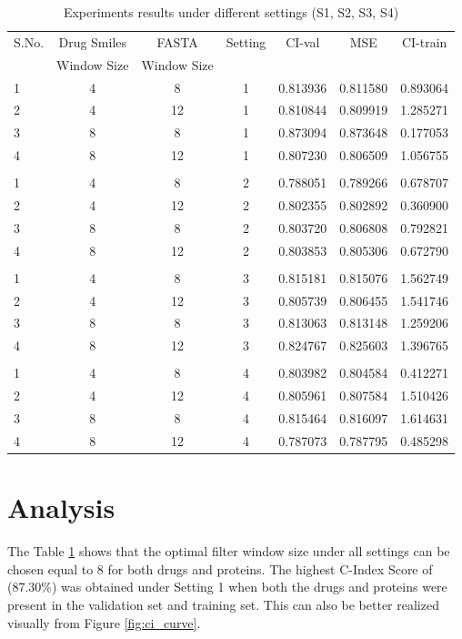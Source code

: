 \begin{table}[H]
    \centering
    \caption{Experiments results under different settings (S1, S2, S3, S4)}
    \begin{tabular}{|l|c|c|c|c|c|c|}
    \hline 
    
     S.No. & Drug Smiles & FASTA & Setting & CI-val & MSE & CI-train \\ 
     & Window Size &  Window Size  &  & &  &  \\  \hline 
    1 & 4 & 8 & 1 & 0.813936 & 0.811580 & 0.893064 \\ \hline
    2 & 4 & 12 & 1 & 0.810844 & 0.809919 & 1.285271 \\ \hline
    3 & 8 & 8 & 1 & 0.873094 & 0.873648 & 0.177053 \\ \hline
    4 & 8 & 12 & 1 & 0.807230 & 0.806509 & 1.056755 \\ \hline
    \\ \hline
    1 & 4 & 8 & 2 & 0.788051 & 0.789266 & 0.678707 \\ \hline
    2 & 4 & 12 & 2 & 0.802355 & 0.802892 & 0.360900 \\ \hline
    3 & 8 & 8 & 2 & 0.803720 & 0.806808 & 0.792821 \\ \hline
    4 & 8 & 12 & 2 & 0.803853 & 0.805306 & 0.672790 \\ \hline
    \\ \hline
    1 & 4 & 8 & 3 & 0.815181 & 0.815076 & 1.562749 \\ \hline
    2 & 4 & 12 & 3 & 0.805739 & 0.806455 & 1.541746 \\ \hline
    3 & 8 & 8 & 3 & 0.813063 & 0.813148 & 1.259206 \\ \hline
    4 & 8 & 12 & 3 & 0.824767 & 0.825603 & 1.396765 \\ \hline
    \\ \hline
    1 & 4 & 8 & 4 & 0.803982 & 0.804584 & 0.412271 \\ \hline
    2 & 4 & 12 & 4 & 0.805961 & 0.807584 & 1.510426 \\ \hline
    3 & 8 & 8 & 4 & 0.815464 & 0.816097 & 1.614631 \\ \hline
    4 & 8 & 12 & 4 & 0.787073 & 0.787795 & 0.485298 \\ \hline
    
    
    \end{tabular}
    \label{table:results}
\end{table}

\section{Analysis}
The Table \ref{table:results} shows that the optimal filter window size under all settings can be chosen equal to 8 for both drugs and proteins. The highest C-Index Score of (87.30\%) was obtained under Setting 1 when both the drugs and proteins were present in the validation set and training set. This can also be better realized visually from Figure \ref{fig:ci_curve}.
 
